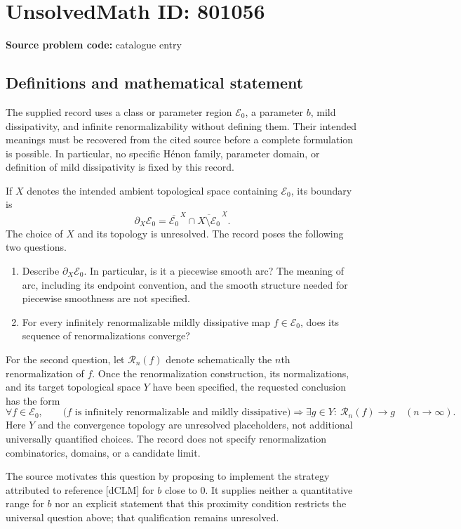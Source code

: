 \documentclass[11pt]{article}
\begin{document}
\section*{UnsolvedMath ID: 801056}
\textbf{Source problem code:} catalogue entry
\subsection{Definitions and mathematical statement}
The supplied record uses a class or parameter region $\mathcal E_0$, a parameter $b$, mild dissipativity, and infinite renormalizability without defining them. Their intended meanings must be recovered from the cited source before a complete formulation is possible. In particular, no specific H\'enon family, parameter domain, or definition of mild dissipativity is fixed by this record.

If $X$ denotes the intended ambient topological space containing $\mathcal E_0$, its boundary is
\[
\partial_X\mathcal E_0
=\overline{\mathcal E_0}^{\,X}\cap\overline{X\setminus\mathcal E_0}^{\,X}.
\]
The choice of $X$ and its topology is unresolved. The record poses the following two questions.
\begin{enumerate}
\item Describe $\partial_X\mathcal E_0$. In particular, is it a piecewise smooth arc? The meaning of arc, including its endpoint convention, and the smooth structure needed for piecewise smoothness are not specified.
\item For every infinitely renormalizable mildly dissipative map $f\in\mathcal E_0$, does its sequence of renormalizations converge?
\end{enumerate}
For the second question, let $\mathcal R_n(f)$ denote schematically the $n$th renormalization of $f$. Once the renormalization construction, its normalizations, and its target topological space $Y$ have been specified, the requested conclusion has the form
\[
\forall f\in\mathcal E_0,\qquad
\bigl(f\text{ is infinitely renormalizable and mildly dissipative}\bigr)
\Longrightarrow
\exists g\in Y:\ \mathcal R_n(f)\longrightarrow g\quad(n\to\infty).
\]
Here $Y$ and the convergence topology are unresolved placeholders, not additional universally quantified choices. The record does not specify renormalization combinatorics, domains, or a candidate limit.

The source motivates this question by proposing to implement the strategy attributed to reference [dCLM] for $b$ close to $0$. It supplies neither a quantitative range for $b$ nor an explicit statement that this proximity condition restricts the universal question above; that qualification remains unresolved.
\end{document}
